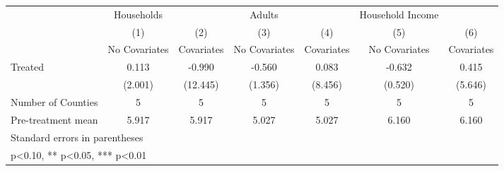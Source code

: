 {
\def\sym#1{\ifmmode^{#1}\else\(^{#1}\)\fi}
\begin{tabular}{l*{6}{c}}
\hline\hline
            &  Households   &               &      Adults   &               &Household Income   &               \\
            &\multicolumn{1}{c}{(1)}&\multicolumn{1}{c}{(2)}&\multicolumn{1}{c}{(3)}&\multicolumn{1}{c}{(4)}&\multicolumn{1}{c}{(5)}&\multicolumn{1}{c}{(6)}\\
            &\multicolumn{1}{c}{No Covariates}&\multicolumn{1}{c}{Covariates}&\multicolumn{1}{c}{No Covariates}&\multicolumn{1}{c}{Covariates}&\multicolumn{1}{c}{No Covariates}&\multicolumn{1}{c}{Covariates}\\
\hline
Treated     &       0.113   &      -0.990   &      -0.560   &       0.083   &      -0.632   &       0.415   \\
            &     (2.001)   &    (12.445)   &     (1.356)   &     (8.456)   &     (0.520)   &     (5.646)   \\
\hline
Number of Counties&           5   &           5   &           5   &           5   &           5   &           5   \\
Pre-treatment mean&       5.917   &       5.917   &       5.027   &       5.027   &       6.160   &       6.160   \\
\hline\hline
\multicolumn{7}{l}{\footnotesize Standard errors in parentheses}\\
\multicolumn{7}{l}{\footnotesize * p<0.10, ** p<0.05, *** p<0.01}\\
\end{tabular}
}
